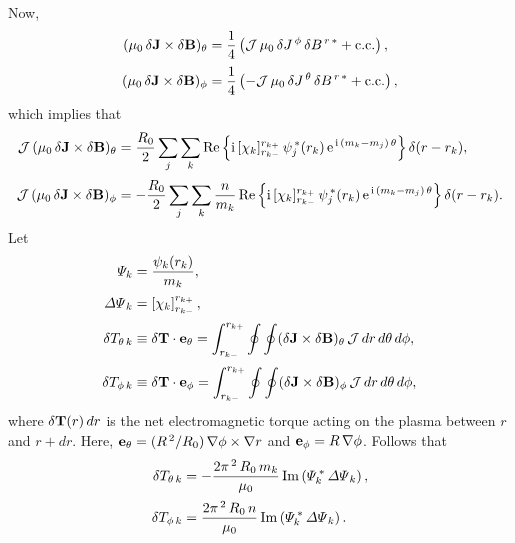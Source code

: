 \documentclass[notitlepage,12pt]{article}
\begin{document}
Now,
\begin{align}
(\mu_0\,\delta{\bf J}\times \delta {\bf B})_\theta&= \frac{1}{4}\left({\cal J}\,\mu_0\,\delta J^{\,\phi}\,\delta B^{\,r\,\ast}+{\rm c.c.}\right),\\[0.5ex]
(\mu_0\,\delta{\bf J}\times \delta {\bf B})_\phi&= \frac{1}{4}\left(-{\cal J}\,{\mu_0}\,\delta J^{\,\theta}\,\delta B^{\,r\,\ast}+{\rm c.c.}\right),
\end{align}
which implies that
\begin{align}
{\cal J}\,(\mu_0\,\delta{\bf J}\times \delta {\bf B})_\theta&=\frac{R_0}{2}\sum_j\sum_k {\rm Re}\left\{{\rm i}\,[\chi_k]_{r_{k-}}^{r_{k+}}\,\psi_j^{\,\ast}(r_k)\,{\rm e}^{\,{\rm i}\,(m_k-m_j)\,\theta}\right\}\delta(r-r_k),\\[0.5ex]
{\cal J}\,(\mu_0\,\delta {\bf J}\times \delta {\bf B})_\phi&= -\frac{R_0}{2}\sum_j\sum_k \frac{n}{m_k}\, {\rm Re}\left\{{\rm i}\,[\chi_k]_{r_{k-}}^{r_{k+}}\,\psi_j^{\,\ast}(r_k)\,{\rm e}^{\,{\rm i}\,(m_k-m_j)\,\theta}\right\}\delta(r-r_k).
\end{align}
Let
\begin{align}
{\mit\Psi}_k      &= \frac{\psi_k(r_k)}{m_k},\label{e102}\\[0.5ex]
{\mit\Delta\Psi}_k&=\left[\chi_k\right]_{r_{k-}}^{r_{k+}},\label{e103}\\[0.5ex]
\delta T_{\theta\,k} &\equiv \delta {\bf T}\cdot{\bf e}_\theta= \int_{r_{k-}}^{r_{k+}}\oint\oint (\delta {\bf J}\times \delta {\bf B})_\theta\,{\cal J}\,dr\,d\theta\,d\phi,\\[0.5ex]
\delta T_{\phi\,k} &\equiv \delta {\bf T}\cdot{\bf e}_\phi= \int_{r_{k-}}^{r_{k+}}\oint\oint (\delta {\bf J}\times \delta {\bf B})_\phi\,{\cal J}\,dr\,d\theta\,d\phi,
\end{align}
where $\delta{\bf T}(r)\,dr$ is the net electromagnetic torque acting on the plasma between $r$ and $r+dr$.  Here, ${\bf e}_\theta= (R^{\,2}/R_0)\,\nabla\phi\times\nabla r$ and
${\bf e}_\phi = R\,\nabla\phi$. 
Follows that
\begin{align}
\delta T_{\theta\,k} &= -\frac{2\pi^{\,2}\,R_0\,m_k}{\mu_0}\,{\rm Im}\left({\mit\Psi}_k^{\,\ast}\,{\mit\Delta\Psi}_k\right),\label{et1}\\[0.5ex]
\delta T_{\phi\,k} &= \frac{2\pi^{\,2}\,R_0\,n}{\mu_0}\,{\rm Im}\left({\mit\Psi}_k^{\,\ast}\,{\mit\Delta\Psi}_k\right).\label{et2}
\end{align}
\end{document}
